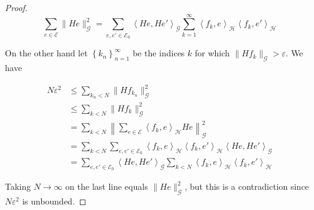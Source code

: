 \documentclass[10pt,a4paper]{amsart}
\newcommand{\aset}[1]{\left \langle #1 \right \rangle}
\newcommand{\bset}[1]{\left \lbrace #1 \right \rbrace}
\begin{document}
\begin{proof}
    $$ \sum_{e \in \mathscr E} \|He\|^2_\mathcal G = \sum_{e, e' \in \mathscr E_0} \aset{He, He'}_{\mathcal G} 
          \sum_{k = 1}^\infty \aset{f_k,e}_\mathcal H \aset{f_k,e'}_\mathcal H $$

    On the other hand let $\bset{k_n}_{n=1}^\infty$ be the indices $k$ for which $\|Hf_k\|_\mathcal G > \varepsilon$. We have 

    \begin{align*}
        N\varepsilon^2 
        & \leq 
        \sum_{k_n < N} \|Hf_{k_n}\|_\mathcal G^2
        \\&\leq 
        \sum_{k < N} \|Hf_k\|_\mathcal G^2
          \\& = 
        \sum_{k < N} \left \| \sum_{e \in \mathcal E} \aset{f_k,e}_\mathcal H  He \right\|_\mathcal G^2
          \\& = 
        \sum_{k < N} \sum_{e,e' \in \mathcal E_0}  \aset{f_k,e}_\mathcal H  \aset{f_k,e'}_\mathcal H \aset{He, He'}_\mathcal G
          \\& = 
       \sum_{e,e' \in \mathcal E_0}\aset{He, He'}_\mathcal G  \sum_{k < N}  \aset{f_k,e}_\mathcal H  \aset{f_k,e'}_\mathcal H  
    \end{align*}

Taking $N \to \infty$ on the last line equals $\|He\|^2_\mathcal G$, but this is a contradiction since $N\varepsilon^2$ is unbounded.   
\end{proof}
\end{document}
